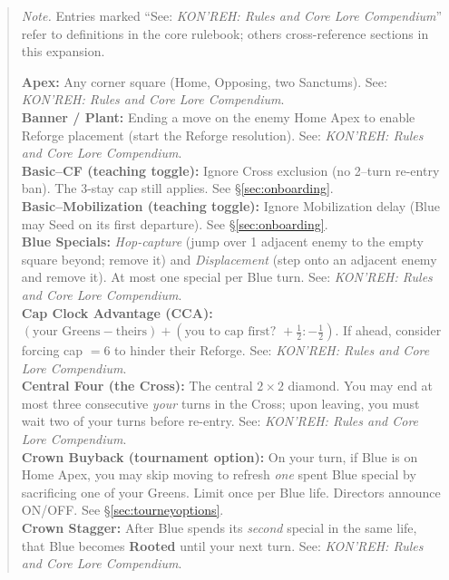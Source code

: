 \documentclass[11pt]{article}
\begin{document}
\begin{quote}
\noindent\emph{Note.} Entries marked “See: \textit{KON’REH: Rules and Core Lore Compendium}” refer to definitions in the core rulebook; others cross-reference sections in this expansion.

\medskip

\textbf{Apex:} Any corner square (Home, Opposing, two Sanctums). See: \textit{KON’REH: Rules and Core Lore Compendium}.\\

\textbf{Banner / Plant:} Ending a move on the enemy Home Apex to enable Reforge placement (start the Reforge resolution). See: \textit{KON’REH: Rules and Core Lore Compendium}.\\

\textbf{Basic–CF (teaching toggle):} Ignore Cross exclusion (no 2–turn re-entry ban). The 3-stay cap still applies. See \S\ref{sec:onboarding}.\\

\textbf{Basic–Mobilization (teaching toggle):} Ignore Mobilization delay (Blue may Seed on its first departure). See \S\ref{sec:onboarding}.\\

\textbf{Blue Specials:} \emph{Hop-capture} (jump over 1 adjacent enemy to the empty square beyond; remove it) and \emph{Displacement} (step onto an adjacent enemy and remove it). At most one special per Blue turn. See: \textit{KON’REH: Rules and Core Lore Compendium}.\\

\textbf{Cap Clock Advantage (CCA):} $(\text{your Greens} - \text{theirs}) + (\text{you to cap first? } +\tfrac12 : -\tfrac12)$. If ahead, consider forcing cap $=6$ to hinder their Reforge. See: \textit{KON’REH: Rules and Core Lore Compendium}.\\

\textbf{Central Four (the Cross):} The central $2\times2$ diamond. You may end at most three consecutive \emph{your} turns in the Cross; upon leaving, you must wait two of your turns before re-entry. See: \textit{KON’REH: Rules and Core Lore Compendium}.\\

\textbf{Crown Buyback (tournament option):} On your turn, if Blue is on Home Apex, you may skip moving to refresh \emph{one} spent Blue special by sacrificing one of your Greens. Limit once per Blue life. Directors announce ON/OFF. See \S\ref{sec:tourneyoptions}.\\

\textbf{Crown Stagger:} After Blue spends its \emph{second} special in the same life, that Blue becomes \textbf{Rooted} until your next turn. See: \textit{KON’REH: Rules and Core Lore Compendium}.\\


\end{quote}
\end{document}
